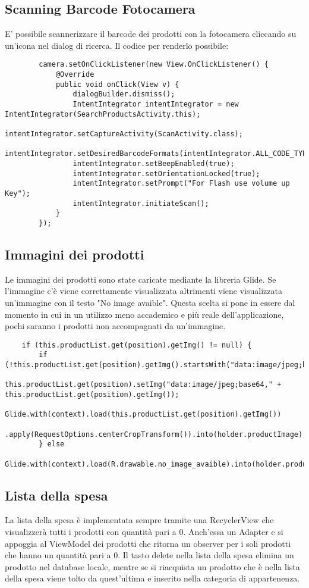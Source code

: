 \documentclass[11pt]{article}
\begin{document}
    \subsection{Scanning Barcode Fotocamera}
    E' possibile scannerizzare il barcode dei prodotti con la fotocamera cliccando su un'icona nel dialog di ricerca.
    Il codice per renderlo possibile:
    \begin{lstlisting}
        camera.setOnClickListener(new View.OnClickListener() {
            @Override
            public void onClick(View v) {
                dialogBuilder.dismiss();
                IntentIntegrator intentIntegrator = new IntentIntegrator(SearchProductsActivity.this);
                intentIntegrator.setCaptureActivity(ScanActivity.class);
                intentIntegrator.setDesiredBarcodeFormats(intentIntegrator.ALL_CODE_TYPES);
                intentIntegrator.setBeepEnabled(true);
                intentIntegrator.setOrientationLocked(true);
                intentIntegrator.setPrompt("For Flash use volume up Key");
                intentIntegrator.initiateScan();
            }
        });
    \end{lstlisting}
    \subsection{Immagini dei prodotti}
    Le immagini dei prodotti sono state caricate mediante la libreria Glide. Se l'immagine c'è viene correttamente visualizzata
    altrimenti viene visualizzata un'immagine con il testo "No image avaible". Questa scelta si pone in essere dal momento in cui
    in un utilizzo meno accademico e più reale dell'applicazione, pochi saranno i prodotti non accompagnati da un'immagine.
    \begin{lstlisting}
    if (this.productList.get(position).getImg() != null) {
        if (!this.productList.get(position).getImg().startsWith("data:image/jpeg;base64,"))
            this.productList.get(position).setImg("data:image/jpeg;base64," + this.productList.get(position).getImg());
        Glide.with(context).load(this.productList.get(position).getImg())
               .apply(RequestOptions.centerCropTransform()).into(holder.productImage);
        } else
           Glide.with(context).load(R.drawable.no_image_avaible).into(holder.productImage);
    \end{lstlisting}
    \subsection{Lista della spesa}
    La lista della spesa è implementata sempre tramite una RecyclerView che visualizzerà tutti i prodotti con quantità
    pari a 0. Anch'essa un Adapter  e si appoggia al ViewModel dei prodotti che ritorna un observer per i soli prodotti che hanno un quantità 
    pari a 0. Il tasto delete nella lista della spesa elimina un prodotto nel database locale, mentre se si riacquista un prodotto
    che è nella lista della spesa viene tolto da quest'ultima e inserito nella categoria di appartenenza.
\end{document}
